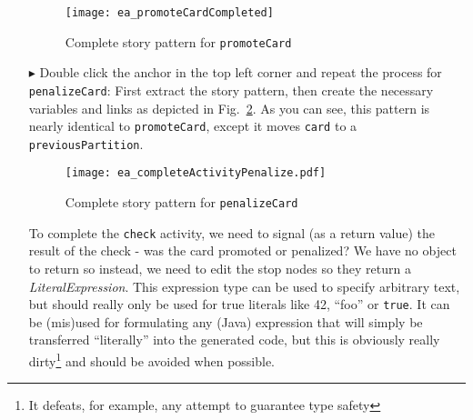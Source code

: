 \begin{itemize}
\begin{figure}[htbp]
\begin{center}
  \texttt{[image: ea\_promoteCardCompleted]}
  \caption{Complete story pattern for \texttt{promoteCard}}
  \label{ea:sdm_check_complete_activity_node}
\end{center}
\end{figure}

\clearpage

\item[$\blacktriangleright$] Double click the anchor in the top left corner and repeat the process for \texttt{penalizeCard}: First extract the story pattern,
then create the necessary variables and links as depicted in Fig.~\ref{ea:sdm_check_complete_penalize}. As you can see, this pattern is nearly identical to
\texttt{promoteCard}, except it moves \texttt{card} to a \texttt{previousPartition}.

\vspace{0.5cm}

\begin{figure}[htbp]
\begin{center}
  \texttt{[image: ea\_completeActivityPenalize.pdf]}
  \caption{Complete story pattern for \texttt{penalizeCard}}
  \label{ea:sdm_check_complete_penalize}
\end{center}
\end{figure}


\vspace{0.5cm}

To complete the \texttt{check} activity, we need to signal (as a return value) the result of the check - was the card promoted or penalized? We have no object
to return so instead, we need to edit the stop nodes so they return a \emph{LiteralExpression}. This expression type can be used to
specify arbitrary text, but should really only be used for true literals like 42, ``foo'' or \texttt{true}. It can be (mis)used for formulating any (Java)
expression that will simply be transferred ``literally'' into the generated code, but this is obviously really dirty\footnote{It defeats, for example, any
attempt to guarantee type safety} and should be avoided when possible.

\vspace{0.5cm}


\end{itemize}
